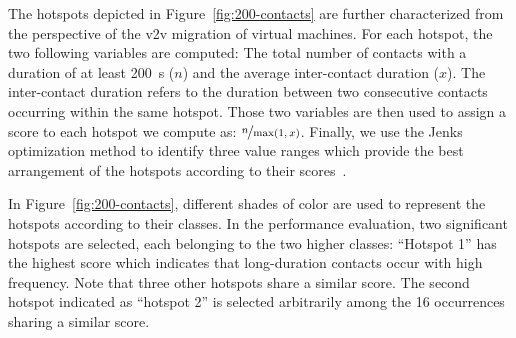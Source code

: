 The hotspots depicted in Figure~\ref{fig:200-contacts} 
are further characterized from the perspective of the \acrshort{v2v} migration of virtual machines. For each hotspot, the two following variables are computed: The total number of contacts with a duration of at least 200~s ($n$) and the average inter-contact duration ($x$). The inter-contact duration refers to the duration between two consecutive contacts occurring within the same hotspot. Those two variables are then used to assign a score to each hotspot we compute as: $\nicefrac{n}{\max(1,\,x)}$. Finally, we use the Jenks optimization method to identify three value ranges which provide the best arrangement of the hotspots according to their scores~\cite{jenks1963generalization}.

In Figure~\ref{fig:200-contacts}, different shades of color are used to represent the hotspots according to their classes. In the performance evaluation, two significant hotspots are selected, each belonging to the two higher classes: ``Hotspot 1'' has the highest score which indicates that long-duration contacts occur with high frequency. Note that three other hotspots share a similar score. The second hotspot indicated as ``hotspot 2'' is selected arbitrarily among the 16 occurrences sharing a similar score.

